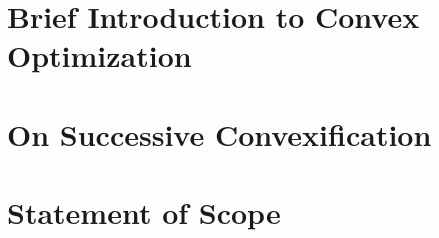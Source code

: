 \section{Brief Introduction to Convex Optimization}

\section{On Successive Convexification}

\section{Statement of Scope}




















